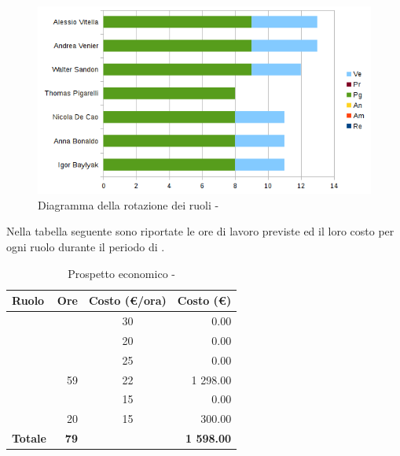 \documentclass[12pt,a4paper]{article}
\begin{document}
\begin{center}
	\begin{figure}[H]
		\centering \includegraphics[width=\textwidth]{../img/diagrammaBarreProgettazioneArchitetturaleRotazioneRuoli.png}
		\caption{Diagramma della rotazione dei ruoli - \FPA{}}
	\end{figure}
\end{center}

\newpage
{}
Nella tabella seguente sono riportate le ore di lavoro previste ed il loro costo per ogni ruolo durante il periodo di \FP.

\begin{table}[H]
	\begin{center}
		\begin{tabular}{l r c r}
			\toprule
			\textbf{Ruolo}	& \textbf{Ore} & \textbf{Costo (\euro/ora)}	& \textbf{Costo (\euro)} \\ \midrule
			\midrule
			\RE{} & & 30 & 0.00 \\ \midrule
			\AM{} & & 20 & 0.00 \\ \midrule
			\AN{} & & 25 & 0.00 \\ \midrule
			\PG{} & 59 & 22 & 1 298.00 \\ \midrule
			\PR{} & & 15 & 0.00 \\ \midrule
			\VR{} & 20 & 15 & 300.00 \\ \midrule
			\textbf{Totale} & \textbf{79} &  & \textbf{1 598.00} \\
			\bottomrule
		\end{tabular}
		\caption{Prospetto economico - \FPA{}}
	\end{center}
\end{table}
\end{document}
